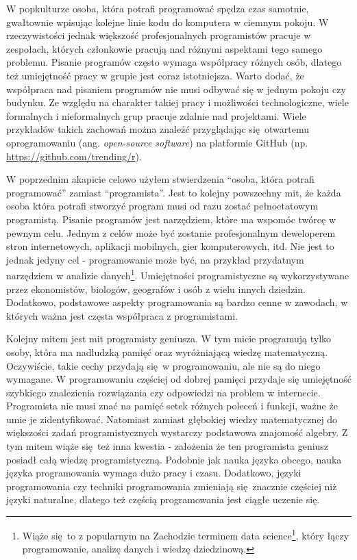 \documentclass[paper=6in:9in,pagesize=pdftex,headinclude=on,footinclude=on,10pt]{scrbook}
\DeclareRobustCommand{\href}[2]{#2\footnote{\url{#1}}}
\begin{document}
W popkulturze osoba, która potrafi programować spędza czas samotnie, gwałtownie wpisując kolejne linie kodu do komputera w ciemnym pokoju.
W rzeczywistości jednak większość profesjonalnych programistów pracuje w zespołach, których członkowie pracują nad różnymi aspektami tego samego problemu.
Pisanie programów często wymaga współpracy różnych osób, dlatego też umiejętność pracy w grupie jest coraz istotniejsza.
Warto dodać, że współpraca nad pisaniem programów nie musi odbywać się w jednym pokoju czy budynku.
Ze względu na charakter takiej pracy i możliwości technologiczne, wiele formalnych i nieformalnych grup pracuje zdalnie nad projektami.
Wiele przykładów takich zachowań można znaleźć przyglądając się~otwartemu oprogramowaniu (ang. \emph{open-source software}) na platformie GitHub (np. \url{https://github.com/trending/r}).

W poprzednim akapicie celowo użyłem stwierdzenia ``osoba, która potrafi programować'' zamiast ``programista''.
Jest to kolejny powszechny mit, że każda osoba która potrafi stworzyć program musi od razu zostać pełnoetatowym programistą.
Pisanie programów jest narzędziem, które ma wspomóc twórcę w pewnym celu.
Jednym z celów może być zostanie profesjonalnym deweloperem stron internetowych, aplikacji mobilnych, gier komputerowych, itd.
Nie jest to jednak jedyny cel - programowanie może być, na przykład przydatnym narzędziem w analizie danych\footnote{Wiąże się~to z popularnym na Zachodzie terminem \href{https://en.wikipedia.org/wiki/Data_science}{data science}, który łączy programowanie, analizę danych i wiedzę dziedzinową.}.
Umiejętności programistyczne są wykorzystywane przez ekonomistów, biologów, geografów i osób z wielu innych dziedzin.
Dodatkowo, podstawowe aspekty programowania są bardzo cenne w zawodach, w których ważna jest częsta współpraca z programistami.

Kolejny mitem jest mit programisty geniusza.
W tym micie programują tylko osoby, która ma nadludzką pamięć oraz wyróżniającą wiedzę matematyczną.
Oczywiście, takie cechy przydają się~w programowaniu, ale nie są do niego wymagane.
W programowaniu częściej od dobrej pamięci przydaje się umiejętność szybkiego znalezienia rozwiązania czy odpowiedzi na problem w internecie.
Programista nie musi znać na pamięć setek różnych poleceń i funkcji, ważne że umie je zidentyfikować.
Natomiast zamiast głębokiej wiedzy matematycznej do większości zadań programistycznych wystarczy podstawowa znajomość algebry.
Z tym mitem wiąże się~też inna kwestia - założenia że ten programista geniusz posiadł całą wiedzę programistyczną.
Podobnie jak nauka języka obcego, nauka języka programowania wymaga dużo pracy i czasu.
Dodatkowo, języki programowania czy techniki programowania zmieniają się~znacznie częściej niż języki naturalne, dlatego też częścią programowania jest ciągłe uczenie się.
\end{document}
